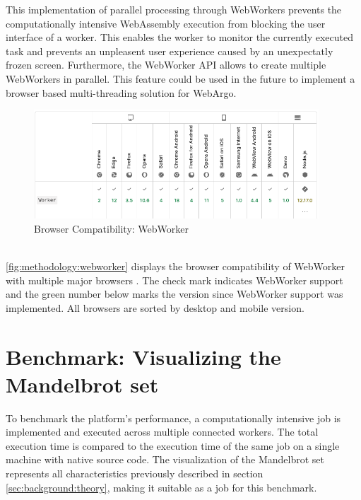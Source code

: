 This implementation of parallel processing through WebWorkers prevents the computationally intensive WebAssembly execution from blocking the user interface of a worker. This enables the worker to monitor the currently executed task and prevents an unpleasent user experience caused by an unexpectatly frozen screen. Furthermore, the WebWorker \ac{API} allows to create multiple WebWorkers in parallel. This feature could be used in the future to implement a browser based multi-threading solution for WebArgo.
\begin{figure}[htbp]
  \centering
  \includegraphics[width=0.95\textwidth]{gfx/figures/webworker-browsercompability.png}
  \caption{Browser Compatibility: WebWorker \cite{methodology:webworkers}}
  \label{fig:methodology:webworker}
\end{figure}
~\\
\autoref{fig:methodology:webworker} displays the browser compatibility of WebWorker with multiple major browsers \cite{methodology:webworkers}. The check mark indicates WebWorker support and the green number below marks the version since WebWorker support was implemented. All browsers are sorted by desktop and mobile version. 

\section{Benchmark: Visualizing the Mandelbrot set}
\label{sec:methodology:benchmark}
To benchmark the platform's performance, a computationally intensive job is implemented and executed across multiple connected workers. The total execution time is compared to the execution time of the same job on a single machine with native source code. The visualization of the Mandelbrot set represents all characteristics previously described in section \ref{sec:background:theory}, making it suitable as a job for this benchmark.

